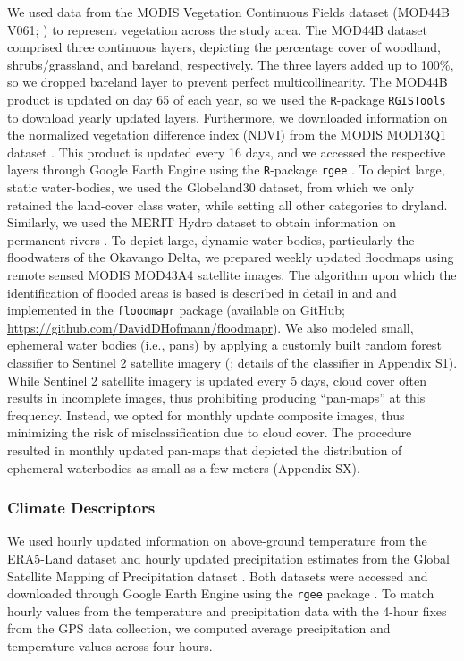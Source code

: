 \documentclass[abstract=on,10pt,a4paper,bibliography=totocnumbered]{article}
\begin{document}
We used data from the MODIS Vegetation Continuous Fields dataset (MOD44B V061;
\citealp{DiMiceli.2022}) to represent vegetation across the study area. The
MOD44B dataset comprised three continuous layers, depicting the percentage cover
of woodland, shrubs/grassland, and bareland, respectively. The three layers
added up to 100\%, so we dropped bareland layer to prevent perfect
multicollinearity. The MOD44B product is updated on day 65 of each year, so we
used the \texttt{R}-package \texttt{RGISTools} \citep{Perez-Goya.2020} to
download yearly updated layers. Furthermore, we downloaded information on the
normalized vegetation difference index (NDVI) from the MODIS MOD13Q1 dataset
\citep{Didan.2015}. This product is updated every 16 days, and we accessed the
respective layers through Google Earth Engine \citep{Gorelick.2017} using the
\texttt{R}-package \texttt{rgee} \citep{Aybar.2023}. To depict large, static
water-bodies, we used the Globeland30 dataset, from which we only retained the
land-cover class water, while setting all other categories to dryland.
Similarly, we used the MERIT Hydro dataset to obtain information on permanent
rivers \citep{Yamazaki.2019}. To depict large, dynamic water-bodies,
particularly the floodwaters of the Okavango Delta, we prepared weekly updated
floodmaps using remote sensed MODIS MOD43A4 satellite images. The algorithm upon
which the identification of flooded areas is based is described in detail in
\citet{Wolski.2017} and \citet{Hofmann.2021} and implemented in the
\texttt{floodmapr} package (available on GitHub;
\url{https://github.com/DavidDHofmann/floodmapr}). We also modeled small,
ephemeral water bodies (i.e., pans) by applying a customly built random forest
classifier to Sentinel 2 satellite imagery (\citealp{EuropeanSpaceAgency.2018};
details of the classifier in Appendix S1). While Sentinel 2 satellite imagery is
updated every 5 days, cloud cover often results in incomplete images, thus
prohibiting producing ``pan-maps'' at this frequency. Instead, we opted for
monthly update composite images, thus minimizing the risk of misclassification
due to cloud cover. The procedure resulted in monthly updated pan-maps that
depicted the distribution of ephemeral waterbodies as small as a few meters
(Appendix SX).

\subsubsection{Climate Descriptors}
We used hourly updated information on above-ground temperature from the
ERA5-Land dataset \citep{Munoz-Sabater.2021} and hourly updated precipitation
estimates from the Global Satellite Mapping of Precipitation dataset
\citep{Kubota.2020}. Both datasets were accessed and downloaded through Google
Earth Engine \citep{Gorelick.2017} using the \texttt{rgee} package
\citep{Aybar.2023}. To match hourly values from the temperature and
precipitation data with the 4-hour fixes from the GPS data collection, we
computed average precipitation and temperature values across four hours.
\end{document}
